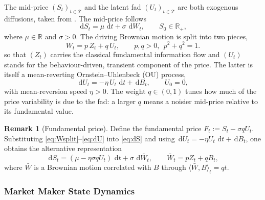 \documentclass[11pt,a4paper]{article}
\theoremstyle{plain}
\theoremstyle{definition}
\newtheorem{remark}[theorem]{Remark}
\newcommand{\R}{\mathbb{R}}
\newcommand{\dd}{\,\mathrm{d}}
\begin{document}
The mid-price $(S_t)_{t\in\mathcal{T}}$ and the latent fad
$(U_t)_{t\in\mathcal{T}}$ are both exogenous diffusions, taken from
\cite{barucci2025market}. The mid-price follows
\begin{equation}
\label{eq:dS}
  \dd S_t = \mu \,\dd t + \sigma \,\dd W_t, \qquad S_0 \in \R_+,
\end{equation}
where $\mu\in\R$ and $\sigma>0$. The driving Brownian motion is split
into two pieces,
\begin{equation}
\label{eq:Wsplit}
  W_t = p\,Z_t + q\,U_t, \qquad p,q>0,\ \ p^2+q^2=1.
\end{equation}
so that $(Z_t)$ carries the classical fundamental information flow and
$(U_t)$ stands for the behaviour-driven, transient component of the price.
The latter is itself a mean-reverting Ornstein--Uhlenbeck (OU) process,
\begin{equation}
\label{eq:dU}
  \dd U_t = -\eta\,U_t\,\dd t + \dd B_t, \qquad U_0=0,
\end{equation}
with mean-reversion speed $\eta>0$. The weight $q\in(0,1)$ tunes how
much of the price variability is due to the fad: a larger $q$ means a
noisier mid-price relative to its fundamental value.

\begin{remark}[Fundamental price]
\label{rem:fundamental}
Define the fundamental price
\(F_t := S_t - \sigma q U_t.\)
Substituting \eqref{eq:Wsplit}--\eqref{eq:dU} into \eqref{eq:dS} and using
$\dd U_t=-\eta U_t\,\dd t + \dd B_t$, one obtains the alternative
representation
\[
  \dd S_t = (\mu - \eta\sigma q U_t)\,\dd t + \sigma \,\dd \bar{W}_t,
  \qquad \bar{W}_t = pZ_t + qB_t,
\]
where $\bar{W}$ is a Brownian motion correlated with $B$ through
$\langle \bar{W},B\rangle_t = qt$.
\end{remark}

\subsubsection{Market Maker State Dynamics}
\end{document}
